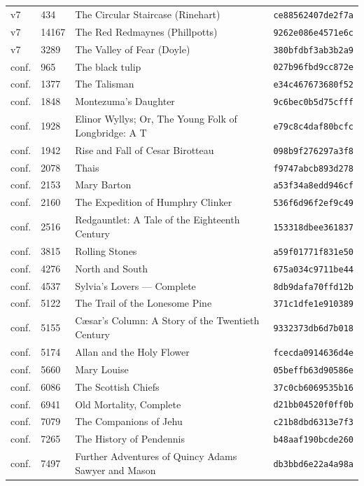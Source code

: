 \documentclass[11pt]{article}
\begin{document}
{\begin{longtable}{p{0.9cm}p{1.0cm}p{8.4cm}p{3.2cm}}
v7 & 434 & The Circular Staircase (Rinehart) & \texttt{ce88562407de2f7a} \\
v7 & 14167 & The Red Redmaynes (Phillpotts) & \texttt{9262e086e4571e6c} \\
v7 & 3289 & The Valley of Fear (Doyle) & \texttt{380bfdbf3ab3b2a9} \\
conf. & 965 & The black tulip & \texttt{027b96fbd9cc872e} \\
conf. & 1377 & The Talisman & \texttt{e34c467673680f52} \\
conf. & 1848 & Montezuma's Daughter & \texttt{9c6bec0b5d75cfff} \\
conf. & 1928 & Elinor Wyllys; Or, The Young Folk of Longbridge: A T & \texttt{e79c8c4daf80bcfc} \\
conf. & 1942 & Rise and Fall of Cesar Birotteau & \texttt{098b9f276297a3f8} \\
conf. & 2078 & Thais & \texttt{f9747abcb893d278} \\
conf. & 2153 & Mary Barton & \texttt{a53f34a8edd946cf} \\
conf. & 2160 & The Expedition of Humphry Clinker & \texttt{536f6d96f2ef9c49} \\
conf. & 2516 & Redgauntlet: A Tale of the Eighteenth Century & \texttt{153318dbee361837} \\
conf. & 3815 & Rolling Stones & \texttt{a59f01771f831e50} \\
conf. & 4276 & North and South & \texttt{675a034c9711be44} \\
conf. & 4537 & Sylvia's Lovers — Complete & \texttt{8db9dafa70ffd12b} \\
conf. & 5122 & The Trail of the Lonesome Pine & \texttt{371c1dfe1e910389} \\
conf. & 5155 & Cæsar's Column: A Story of the Twentieth Century & \texttt{9332373db6d7b018} \\
conf. & 5174 & Allan and the Holy Flower & \texttt{fcecda0914636d4e} \\
conf. & 5660 & Mary Louise & \texttt{05beffb63d90586e} \\
conf. & 6086 & The Scottish Chiefs & \texttt{37c0cb6069535b16} \\
conf. & 6941 & Old Mortality, Complete & \texttt{d21bb04520f0ff0b} \\
conf. & 7079 & The Companions of Jehu & \texttt{c21b8dbd6313e7f3} \\
conf. & 7265 & The History of Pendennis & \texttt{b48aaf190bcde260} \\
conf. & 7497 & Further Adventures of Quincy Adams Sawyer and Mason  & \texttt{db3bbd6e22a4a98a} \\

\end{longtable}}
\end{document}
